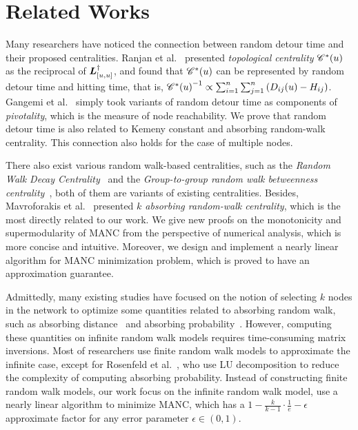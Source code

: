 \documentclass[10pt,twocolumn,twoside]{IEEEtran}
\begin{document}
\section{Related Works}

Many researchers have noticed the connection between random detour time and their proposed centralities.
Ranjan et al.~\cite{RaZh13} presented \textit{topological centrality} \(\mathscr{C}^*(u)\) as the reciprocal of \(\boldsymbol{L}^\dagger_{[u,u]}\), and found that \(\mathscr{C}^*(u)\) can be represented by random detour time and hitting time, that is, \({\mathscr{C}^*(u)}^{-1}\propto \sum_{i=1}^n\sum_{j=1}^n\left( D_{ij}(u)-H_{ij} \right)\).
Gangemi et al.~\cite{GaLePaGoLiZh15} simply took variants of random detour time as components of \textit{pivotality}, which is the measure of node reachability.
We prove that random detour time is also related to Kemeny constant and absorbing random-walk centrality.
This connection also holds for the case of multiple nodes.

There also exist various random walk-based centralities, such as the \textit{Random Walk Decay Centrality}~\cite{WaRaSk19} and the \textit{Group-to-group random walk betweenness centrality}~\cite{GiBaRa21}, both of them are variants of existing centralities.
Besides, Mavroforakis et al.~\cite{MaMaGi15} presented \textit{\(k\) absorbing random-walk centrality}, which is the most directly related to our work.
We give new proofs on the monotonicity and supermodularity of MANC from the perspective of numerical analysis, which is more concise and intuitive.
Moreover, we design and implement a nearly linear algorithm for MANC minimization problem, which is proved to have an approximation guarantee.

Admittedly, many existing studies have focused on the notion of selecting \(k\) nodes in the network to optimize some quantities related to absorbing random walk, such as absorbing distance~\cite{LiYuHuCh14,MoBaZhPe20} and absorbing probability~\cite{RoGl16}.
However, computing these quantities on infinite random walk models requires time-consuming matrix inversions.
Most of researchers use finite random walk models to approximate the infinite case, except for Rosenfeld et al.~\cite{RoGl16}, who use LU decomposition to reduce the complexity of computing absorbing probability.
Instead of constructing finite random walk models, our work focus on the infinite random walk model, use a nearly linear algorithm to minimize MANC, which has a \(1-\frac{k}{k-1}\cdot\frac{1}{e}-\epsilon\) approximate factor for any error parameter \(\epsilon\in(0,1)\).
\end{document}
